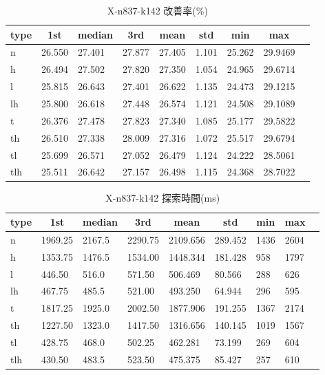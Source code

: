 \begin{table}[htbp]
    \caption{X-n837-k142 改善率(\%)}
    \begin{tabular}{|l|l|l|l|l|l|l|l|l|}\hline
    \multicolumn{1}{|c|}{\textbf{type}}
    &\multicolumn{1}{|c|}{\textbf{1st}}
    &\multicolumn{1}{c|}{\textbf{median}}
    &\multicolumn{1}{c|}{\textbf{3rd}}
    &\multicolumn{1}{c|}{\textbf{mean}}
    &\multicolumn{1}{c|}{\textbf{std}}
    &\multicolumn{1}{c|}{\textbf{min}}
    &\multicolumn{1}{c|}{\textbf{max}}\\\hline
	n & 26.550 & 27.401 & 27.877 & 27.405 & 1.101 & 25.262 & 29.9469\\\hline
	h & 26.494 & 27.502 & 27.820 & 27.350 & 1.054 & 24.965 & 29.6714\\\hline
	l & 25.815 & 26.643 & 27.401 & 26.622 & 1.135 & 24.473 & 29.1215\\\hline
	lh & 25.800 & 26.618 & 27.448 & 26.574 & 1.121 & 24.508 & 29.1089\\\hline
	t & 26.376 & 27.478 & 27.823 & 27.340 & 1.085 & 25.177 & 29.5822\\\hline
	th & 26.510 & 27.338 & 28.009 & 27.316 & 1.072 & 25.517 & 29.6794\\\hline
	tl & 25.699 & 26.571 & 27.052 & 26.479 & 1.124 & 24.222 & 28.5061\\\hline
	tlh & 25.511 & 26.642 & 27.157 & 26.498 & 1.115 & 24.368 & 28.7022\\\hline
	\end{tabular}
\end{table}
\begin{table}[htbp]
    \caption{X-n837-k142 探索時間(ms)}
    \begin{tabular}{|l|l|l|l|l|l|l|l|l|}\hline
    \multicolumn{1}{|c|}{\textbf{type}}
    &\multicolumn{1}{|c|}{\textbf{1st}}
    &\multicolumn{1}{c|}{\textbf{median}}
    &\multicolumn{1}{c|}{\textbf{3rd}}
    &\multicolumn{1}{c|}{\textbf{mean}}
    &\multicolumn{1}{c|}{\textbf{std}}
    &\multicolumn{1}{c|}{\textbf{min}}
    &\multicolumn{1}{c|}{\textbf{max}}\\\hline
	n & 1969.25 & 2167.5 & 2290.75 & 2109.656 & 289.452 & 1436 & 2604\\\hline
	h & 1353.75 & 1476.5 & 1534.00 & 1448.344 & 181.428 & 958 & 1797\\\hline
	l & 446.50 & 516.0 & 571.50 & 506.469 & 80.566 & 288 & 626\\\hline
	lh & 467.75 & 485.5 & 521.00 & 493.250 & 64.944 & 296 & 595\\\hline
	t & 1817.25 & 1925.0 & 2002.50 & 1877.906 & 191.255 & 1367 & 2174\\\hline
	th & 1227.50 & 1323.0 & 1417.50 & 1316.656 & 140.145 & 1019 & 1567\\\hline
	tl & 428.75 & 468.0 & 502.25 & 462.281 & 73.199 & 269 & 604\\\hline
	tlh & 430.50 & 483.5 & 523.50 & 475.375 & 85.427 & 257 & 610\\\hline
	\end{tabular}
\end{table}
